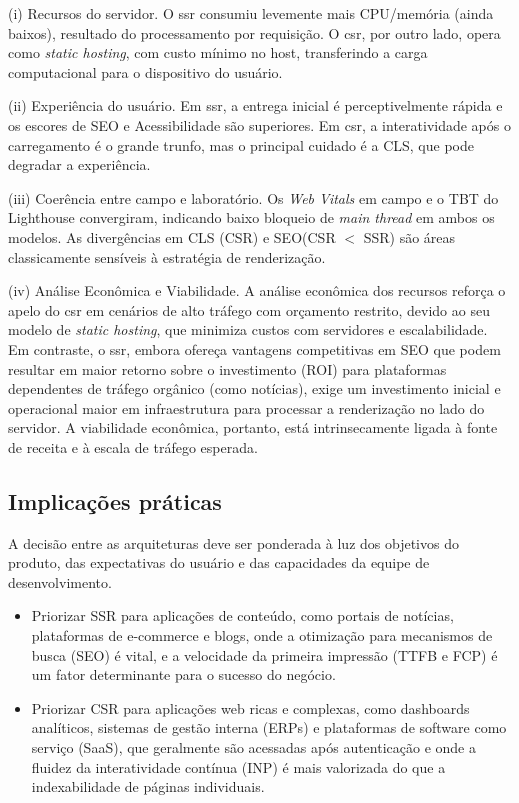 {(i) Recursos do servidor. O \acrshort{ssr} consumiu levemente mais CPU/memória (ainda baixos), resultado do processamento por requisição. O \acrshort{csr}, por outro lado, opera como \emph{static hosting}, com custo mínimo no host, transferindo a carga computacional para o dispositivo do usuário.

(ii) Experiência do usuário. Em \acrshort{ssr}, a entrega inicial é perceptivelmente rápida e os escores de SEO e Acessibilidade são superiores. Em \acrshort{csr}, a interatividade após o carregamento é o grande trunfo, mas o principal cuidado é a CLS, que pode degradar a experiência.

(iii) Coerência entre campo e laboratório. Os \textit{Web Vitals} em campo e o TBT do Lighthouse convergiram, indicando baixo bloqueio de \emph{main thread} em ambos os modelos. As divergências em CLS (CSR) e SEO(CSR $<$ SSR) são áreas classicamente sensíveis à estratégia de renderização.

(iv) Análise Econômica e Viabilidade. A análise econômica dos recursos reforça o apelo do \acrshort{csr} em cenários de alto tráfego com orçamento restrito, devido ao seu modelo de \emph{static hosting}, que minimiza custos com servidores e escalabilidade. Em contraste, o \acrshort{ssr}, embora ofereça vantagens competitivas em SEO que podem resultar em maior retorno sobre o investimento (ROI) para plataformas dependentes de tráfego orgânico (como notícias), exige um investimento inicial e operacional maior em infraestrutura para processar a renderização no lado do servidor. A viabilidade econômica, portanto, está intrinsecamente ligada à fonte de receita e à escala de tráfego esperada.

\subsection{Implicações práticas}
A decisão entre as arquiteturas deve ser ponderada à luz dos objetivos do produto, das expectativas do usuário e das capacidades da equipe de desenvolvimento.
\begin{itemize}
    \item Priorizar SSR para aplicações de conteúdo, como portais de notícias, plataformas de e-commerce e blogs, onde a otimização para mecanismos de busca (SEO) é vital, e a velocidade da primeira impressão (TTFB e FCP) é um fator determinante para o sucesso do negócio.
    \item Priorizar CSR para aplicações web ricas e complexas, como dashboards analíticos, sistemas de gestão interna (ERPs) e plataformas de software como serviço (SaaS), que geralmente são acessadas após autenticação e onde a fluidez da interatividade contínua (INP) é mais valorizada do que a indexabilidade de páginas individuais.
\end{itemize}

}
